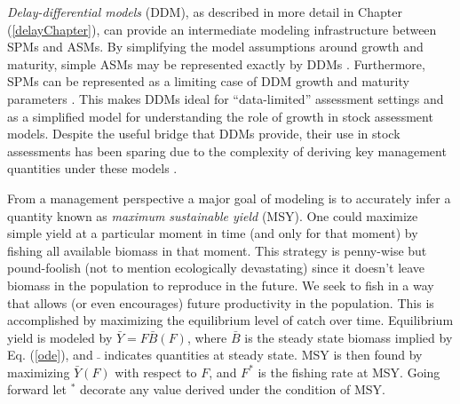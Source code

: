 \documentclass[12pt]{ucscthesis}
\begin{document}
%
{\it Delay-differential models} (DDM), as described in more detail in Chapter (\ref{delayChapter}), 
can provide an intermediate modeling infrastructure between SPMs and ASMs. By 
simplifying the model assumptions around growth and maturity, simple ASMs may 
be represented exactly by DDMs \cite{deriso_harvesting_1980, hilborn_quantitative_1992}. 
Furthermore, SPMs can be represented as a limiting case of DDM growth and 
maturity parameters \cite{walters_continuous_2020}. This makes DDMs ideal for ``data-limited'' assessment 
settings and as a simplified model for understanding the role of growth in 
stock assessment models. Despite the useful bridge that DDMs provide, their use in stock 
assessments has been sparing due to the complexity of deriving key management 
quantities under these models \cite{dick_depletion-based_2011, munyandorero_analytical_2023}.%



From a management perspective a major goal of modeling is to accurately infer
a quantity known as \emph{maximum sustainable yield} (MSY). One could maximize
simple yield at a particular moment in time (and only for that moment) by
fishing all available biomass in that moment. This strategy is penny-wise but
pound-foolish (not to mention ecologically devastating) since it doesn't leave
biomass in the population to reproduce in the future. We seek to fish in a way
that allows (or even encourages) future productivity in the population. This is
accomplished by maximizing the equilibrium level of catch over time.
Equilibrium yield is modeled by $\bar Y = F\bar B(F)$, where $\bar B$ is the 
steady state biomass implied by Eq. (\ref{ode}), and $\bar~$ indicates quantities 
at steady state. 
MSY is then found by maximizing $\bar Y(F)$ with respect to $F$, and $F^*$ is 
the fishing rate at MSY. Going forward let $^*$ decorate any value derived 
under the condition of MSY.
\end{document}
